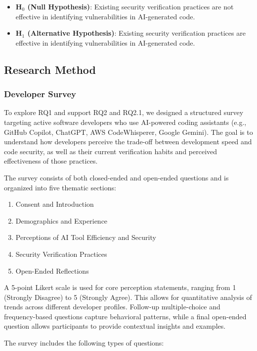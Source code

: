 \begin{itemize}
    \item \textbf{H$_{0}$ (Null Hypothesis)}: Existing security verification practices are not effective in identifying vulnerabilities in AI-generated code.
    \item \textbf{H$_{1}$ (Alternative Hypothesis)}: Existing security verification practices are effective in identifying vulnerabilities in AI-generated code.
\end{itemize}

\subsection{Research Method}

\subsubsection{Developer Survey}

To explore RQ1 and support RQ2 and RQ2.1, we designed a structured survey targeting active software developers who use AI-powered coding assistants (e.g., GitHub Copilot, ChatGPT, AWS CodeWhisperer, Google Gemini). The goal is to understand how developers perceive the trade-off between development speed and code security, as well as their current verification habits and perceived effectiveness of those practices.

The survey consists of both closed-ended and open-ended questions and is organized into five thematic sections:
\begin{enumerate}
    \item Consent and Introduction
    \item Demographics and Experience
    \item Perceptions of AI Tool Efficiency and Security
    \item Security Verification Practices
    \item Open-Ended Reflections
\end{enumerate}

A 5-point Likert scale is used for core perception statements, ranging from 1 (Strongly Disagree) to 5 (Strongly Agree). This allows for quantitative analysis of trends across different developer profiles. Follow-up multiple-choice and frequency-based questions capture behavioral patterns, while a final open-ended question allows participants to provide contextual insights and examples.

The survey includes the following types of questions:

